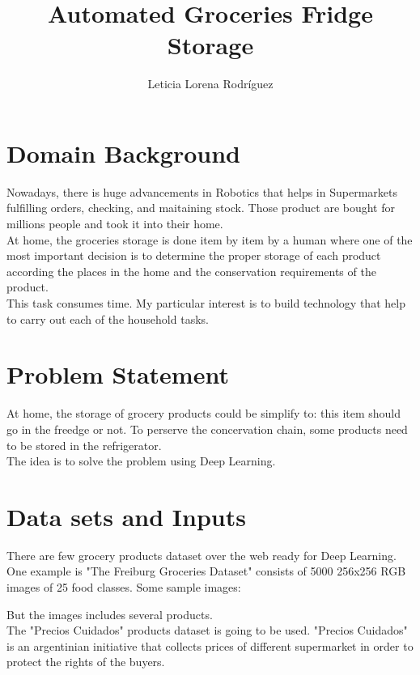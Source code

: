 \documentclass[a4paper,10pt]{report}
\title{Automated Groceries Fridge Storage}
\author{Leticia Lorena Rodr\'iguez}
\begin{document}
\maketitle 

\section{Domain Background}

Nowadays, there is huge advancements in Robotics that helps in Supermarkets fulfilling orders, checking, and maitaining stock. Those product are bought for millions people and took it into their home. \\

At home, the groceries storage is done item by item by a human where one of the most important decision is to determine the proper storage of each product according the places in the home and the conservation requirements of the product.\\

This task consumes time. My particular interest is to build technology that help to carry out each of the household tasks. \\

\section{Problem Statement}

At home, the storage of grocery products could be simplify to: this item should go in the freedge or not. To perserve the concervation chain, some products need to be stored in the refrigerator.\\

The idea is to solve the problem using Deep Learning. \\

\section{Data sets and Inputs}

There are few grocery products dataset over the web ready for Deep Learning. One example is "The Freiburg Groceries Dataset" consists of 5000 256x256 RGB images of 25 food classes. Some sample images:


But the images includes several products. \\

The "Precios Cuidados" products dataset is going to be used. "Precios Cuidados" is an argentinian initiative that collects prices of different supermarket in order to protect the rights of the buyers.
\end{document}
